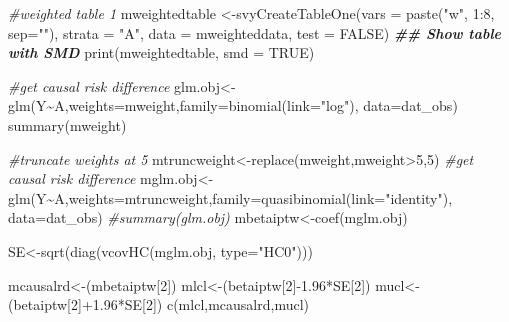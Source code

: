 \documentclass[
]{article}
\newenvironment{Shaded}{\begin{snugshade}}{\end{snugshade}}
\newcommand{\AttributeTok}[1]{\textcolor[rgb]{0.77,0.63,0.00}{#1}}
\newcommand{\CommentTok}[1]{\textcolor[rgb]{0.56,0.35,0.01}{\textit{#1}}}
\newcommand{\ConstantTok}[1]{\textcolor[rgb]{0.00,0.00,0.00}{#1}}
\newcommand{\DecValTok}[1]{\textcolor[rgb]{0.00,0.00,0.81}{#1}}
\newcommand{\DocumentationTok}[1]{\textcolor[rgb]{0.56,0.35,0.01}{\textbf{\textit{#1}}}}
\newcommand{\FloatTok}[1]{\textcolor[rgb]{0.00,0.00,0.81}{#1}}
\newcommand{\FunctionTok}[1]{\textcolor[rgb]{0.00,0.00,0.00}{#1}}
\newcommand{\NormalTok}[1]{#1}
\newcommand{\OtherTok}[1]{\textcolor[rgb]{0.56,0.35,0.01}{#1}}
\newcommand{\SpecialCharTok}[1]{\textcolor[rgb]{0.00,0.00,0.00}{#1}}
\newcommand{\StringTok}[1]{\textcolor[rgb]{0.31,0.60,0.02}{#1}}
\begin{document}
\begin{Shaded}
\begin{Highlighting}[]
\CommentTok{\#weighted table 1}
\NormalTok{mweightedtable }\OtherTok{\textless{}{-}}\FunctionTok{svyCreateTableOne}\NormalTok{(}\AttributeTok{vars =} \FunctionTok{paste}\NormalTok{(}\StringTok{"w"}\NormalTok{, }\DecValTok{1}\SpecialCharTok{:}\DecValTok{8}\NormalTok{, }\AttributeTok{sep=}\StringTok{""}\NormalTok{), }\AttributeTok{strata =} \StringTok{"A"}\NormalTok{, }
                                  \AttributeTok{data =}\NormalTok{ mweighteddata, }\AttributeTok{test =} \ConstantTok{FALSE}\NormalTok{)}
\DocumentationTok{\#\# Show table with SMD}
\FunctionTok{print}\NormalTok{(mweightedtable, }\AttributeTok{smd =} \ConstantTok{TRUE}\NormalTok{)}

\CommentTok{\#get causal risk difference}
\NormalTok{glm.obj}\OtherTok{\textless{}{-}}\FunctionTok{glm}\NormalTok{(Y}\SpecialCharTok{\textasciitilde{}}\NormalTok{A,}\AttributeTok{weights=}\NormalTok{mweight,}\AttributeTok{family=}\FunctionTok{binomial}\NormalTok{(}\AttributeTok{link=}\StringTok{"log"}\NormalTok{), }\AttributeTok{data=}\NormalTok{dat\_obs)}
\FunctionTok{summary}\NormalTok{(mweight)}

\CommentTok{\#truncate weights at 5}
\NormalTok{mtruncweight}\OtherTok{\textless{}{-}}\FunctionTok{replace}\NormalTok{(mweight,mweight}\SpecialCharTok{\textgreater{}}\DecValTok{5}\NormalTok{,}\DecValTok{5}\NormalTok{)}
\CommentTok{\#get causal risk difference}
\NormalTok{mglm.obj}\OtherTok{\textless{}{-}}\FunctionTok{glm}\NormalTok{(Y}\SpecialCharTok{\textasciitilde{}}\NormalTok{A,}\AttributeTok{weights=}\NormalTok{mtruncweight,}\AttributeTok{family=}\FunctionTok{quasibinomial}\NormalTok{(}\AttributeTok{link=}\StringTok{"identity"}\NormalTok{), }\AttributeTok{data=}\NormalTok{dat\_obs)}
\CommentTok{\#summary(glm.obj)}
\NormalTok{mbetaiptw}\OtherTok{\textless{}{-}}\FunctionTok{coef}\NormalTok{(mglm.obj)}

\NormalTok{SE}\OtherTok{\textless{}{-}}\FunctionTok{sqrt}\NormalTok{(}\FunctionTok{diag}\NormalTok{(}\FunctionTok{vcovHC}\NormalTok{(mglm.obj, }\AttributeTok{type=}\StringTok{"HC0"}\NormalTok{)))}

\NormalTok{mcausalrd}\OtherTok{\textless{}{-}}\NormalTok{(mbetaiptw[}\DecValTok{2}\NormalTok{])}
\NormalTok{mlcl}\OtherTok{\textless{}{-}}\NormalTok{(betaiptw[}\DecValTok{2}\NormalTok{]}\SpecialCharTok{{-}}\FloatTok{1.96}\SpecialCharTok{*}\NormalTok{SE[}\DecValTok{2}\NormalTok{])}
\NormalTok{mucl}\OtherTok{\textless{}{-}}\NormalTok{(betaiptw[}\DecValTok{2}\NormalTok{]}\SpecialCharTok{+}\FloatTok{1.96}\SpecialCharTok{*}\NormalTok{SE[}\DecValTok{2}\NormalTok{])}
\FunctionTok{c}\NormalTok{(mlcl,mcausalrd,mucl)}


\end{Highlighting}
\end{Shaded}
\end{document}
